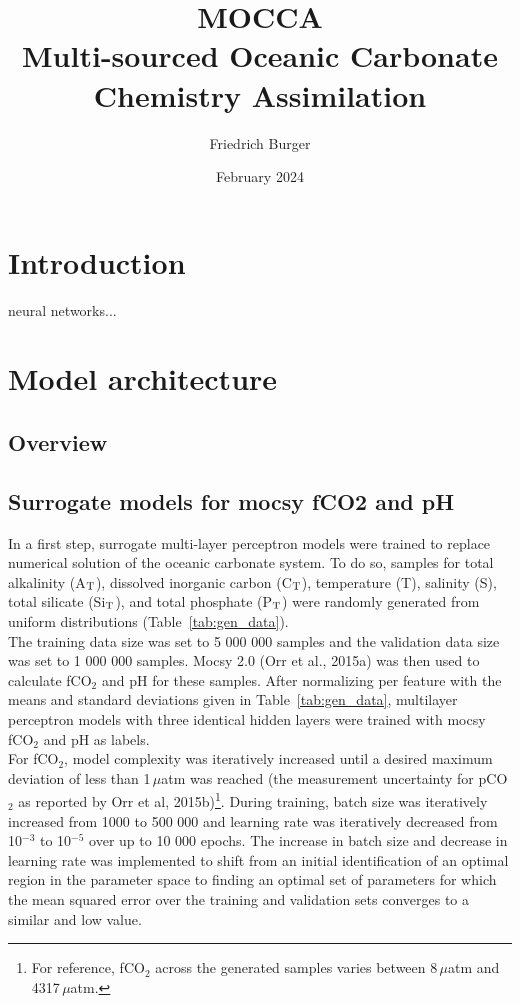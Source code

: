 \documentclass{article}
\title{\textbf{MOCCA} \\
\large Multi-sourced Oceanic Carbonate Chemistry Assimilation}
\author{Friedrich Burger}
\date {February 2024}
\begin{document}
	
	\maketitle
	\tableofcontents
	\section{Introduction}
	neural networks...\cite{goodfellow2016}
	\section{Model architecture}
	\subsection{Overview}
	\subsection{Surrogate models for mocsy fCO2 and pH}
	In a first step, surrogate multi-layer perceptron models were trained to replace numerical solution of the oceanic carbonate system. To do so, samples for total alkalinity (A$_\textup{T}$), dissolved inorganic carbon (C$_\textup{T}$), temperature (T),  salinity (S), total silicate (Si$_\textup{T}$), and total phosphate (P$_\textup{T}$) were randomly generated from uniform distributions (Table~\ref{tab:gen_data}). \\
	The training data size was set to 5 000 000 samples and the validation data size was set to 1 000 000 samples. Mocsy 2.0 (Orr et al., 2015a) was then used to calculate fCO$_2$ and pH for these samples. After normalizing per feature with the means and standard deviations given in Table~\ref{tab:gen_data}, multilayer perceptron models with three identical hidden layers were trained with mocsy fCO$_2$ and pH as labels. \\
	For fCO$_2$, model complexity was iteratively increased until a desired maximum deviation of less than 1\,$\mu$atm was reached (the measurement uncertainty for pCO$_2$ as reported by Orr et al, 2015b)\footnote{For reference, fCO$_2$ across the generated samples varies between 8\,$\mu$atm and 4317\,$\mu$atm.}. During training, batch size was iteratively increased from 1000 to 500 000 and learning rate was iteratively decreased from 10$^{-3}$ to 10$^{-5}$ over up to 10 000 epochs. The increase in batch size and decrease in learning rate was implemented to shift from an initial identification of an optimal region in the parameter space to finding an optimal set of parameters for which the mean squared error over the training and validation sets converges to a similar and low value. \\
\end{document}
